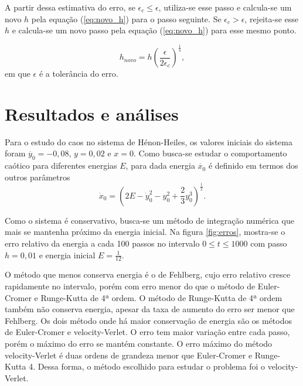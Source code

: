\documentclass[brazilian, 10pt, a4paper, final]{article}
\begin{document}
\begin{multicols*}{2}
A partir dessa estimativa do erro,
se $\epsilon_c \le \epsilon$, utiliza-se esse passo e calcula-se um novo $h$ pela equação (\ref{eq:novo_h}) para o passo seguinte. Se $\epsilon_c > \epsilon$, rejeita-se esse $h$ e calcula-se um novo passo pela equação (\ref{eq:novo_h}) para esse mesmo ponto.

\begin{equation}\label{eq:novo_h}
  h_{novo}=h\left(\frac{\epsilon}{2\epsilon_c}\right)^{\frac{1}{4}},
\end{equation}
em que $\epsilon$ é a tolerância do erro.
\section{Resultados e análises}

Para o estudo do caos no sistema de Hénon-Heiles, os valores iniciais do sistema foram $\dot{y_0}=-0,08$, $y=0,02$ e $x=0$. Como busca-se estudar o comportamento caótico para diferentes energias $E$, para dada energia $\dot{x_0}$ é definido em termos dos outros parâmetros
\begin{equation}\label{eq:vxo}
  \dot{x}_0=\left(2E-\dot{y}_0^2-y_0^2+\frac{2}{3}y_0^3\right)^{\frac{1}{2}}.
\end{equation}

Como o sistema é conservativo, busca-se um método de integração numérica que mais se mantenha próximo da energia inicial. Na figura \ref{fig:erros}, mostra-se o erro relativo da energia a cada 100 passos no intervalo $0 \le t\le 1000$ com passo $h=0,01$ e energia inicial $E=\frac{1}{12}$.

O método que menos conserva energia é o de Fehlberg, cujo erro relativo cresce rapidamente no intervalo, porém com erro menor do que o método de Euler-Cromer e Runge-Kutta de 4ª ordem. O método de Runge-Kutta de 4ª ordem também não conserva energia, apesar da taxa de aumento do erro ser menor que Fehlberg. Os dois método onde há maior conservação de energia são os métodos de Euler-Cromer e velocity-Verlet. O erro tem maior variação entre cada passo, porém o máximo do erro se mantém constante. O erro máximo do método velocity-Verlet é duas ordens de grandeza menor que Euler-Cromer e Runge-Kutta 4. Dessa forma, o método escolhido para estudar o problema foi o velocity-Verlet.


\end{multicols*}
\end{document}
